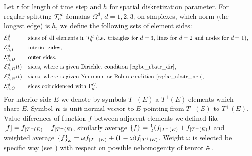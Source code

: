 Let $\tau$ for length of time step and $h$ for spatial diskretization parameter.
For regular splitting $\mathcal T_h^d$ domains $\Omega^d$, $d=1,2,3$, on simplexes,
 which norm (the longest edge) is $h$, we define the following sets of element sides:
\begin{align*}
 &\mathcal E_h^d &&\mbox{sides of all elements in $\mathcal T_h^d$ (i.e. triangles for $d=3$, lines for $d=2$ and nodes for $d=1$)},\\
 &\mathcal E_{h,I}^d &&\mbox{interior sides},\\
 &\mathcal E_{h,B}^d &&\mbox{outer sides},\\
 &\mathcal E_{h,D}^d(t) &&\mbox{sides, where is given Dirichlet condition \eqref{eq:bc_abstr_dir}},\\
 &\mathcal E_{h,N}^d(t) &&\mbox{sides, where is given Neumann or Robin condition \eqref{eq:bc_abstr_neu}},\\
 &\mathcal E_{h,C}^d &&\mbox{sides coincidenced with $\Gamma^C_d$}.
\end{align*}
For interior side $E$ we denote by symbols $T^-(E)$ a $T^+(E)$ elements which share $E$.
Symbol $\mathbf{\boldsymbol{n}}$ is unit normal vector to $E$ pointing from $T^-(E)$ to $T^+(E)$.
Value diferences of function $f$ between adjacent elements we defined like $[f]=f_{|T^-(E)}-f_{|T^+(E)}$,
 similarly average $\left\{f\right\}=\frac12(f_{|T^-(E)} + f_{|T^+(E)})$
 and weighted average $\left\{f\right\}_{\omega}=\omega f_{|T^-(E)} + (1-\omega) f_{|T^+(E)}$.
Weight $\omega$ is selected be specific way (see \cite{ern_stephansen_zunino})
 with respect on possible nehomogenity of tenzor ${\mathbb{A}}$.

